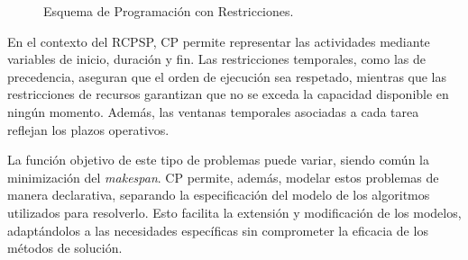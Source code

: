 \documentclass{article}
\begin{document}
\begin{figure}[htbp]
\centering
{}
\caption{Esquema de Programación con Restricciones.}
\label{fig:constraint_programming}
\end{figure}

En el contexto del RCPSP, CP permite representar las actividades mediante variables de inicio, duración y fin. Las restricciones temporales, como las de precedencia, aseguran que el orden de ejecución sea respetado, mientras que las restricciones de recursos garantizan que no se exceda la capacidad disponible en ningún momento. Además, las ventanas temporales asociadas a cada tarea reflejan los plazos operativos.

La función objetivo de este tipo de problemas puede variar, siendo común la minimización del \textit{makespan}. CP permite, además, modelar estos problemas de manera declarativa, separando la especificación del modelo de los algoritmos utilizados para resolverlo. Esto facilita la extensión y modificación de los modelos, adaptándolos a las necesidades específicas sin comprometer la eficacia de los métodos de solución.


\end{document}
